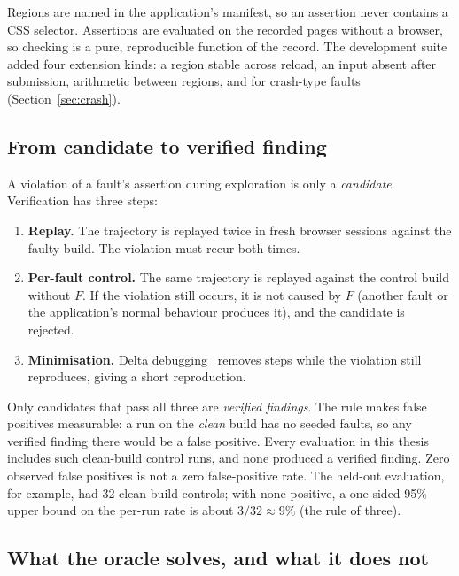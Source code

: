 Regions are named in the application's manifest, so an assertion never contains a CSS
selector. Assertions are evaluated on the recorded pages without a browser, so checking is
a pure, reproducible function of the record. The development suite added four extension
kinds: a region stable across reload, an input absent after submission, arithmetic between
regions, and  for crash-type faults (Section~\ref{sec:crash}).

\subsection{From candidate to verified finding}

A violation of a fault's assertion during exploration is only a \emph{candidate}.
Verification has three steps:

\begin{enumerate}
  \item \textbf{Replay.} The trajectory is replayed twice in fresh browser sessions against
        the faulty build. The violation must recur both times.
  \item \textbf{Per-fault control.} The same trajectory is replayed against the control
        build without $F$. If the violation still occurs, it is not caused by $F$ (another
        fault or the application's normal behaviour produces it), and the candidate is
        rejected.
  \item \textbf{Minimisation.} Delta debugging~\cite{zeller2002simplifying} removes steps
        while the violation still reproduces, giving a short reproduction.
\end{enumerate}

Only candidates that pass all three are \emph{verified findings}. The rule makes false
positives measurable: a run on the \emph{clean} build has no seeded faults, so any verified
finding there would be a false positive. Every evaluation in this thesis includes such
clean-build control runs, and none produced a verified finding. Zero observed false
positives is not a zero false-positive rate. The held-out evaluation, for example, had 32
clean-build controls; with none positive, a one-sided 95\% upper bound on the per-run rate
is about $3/32 \approx 9\%$ (the rule of three).

\subsection{What the oracle solves, and what it does not}
\label{sec:oracle-limits}

